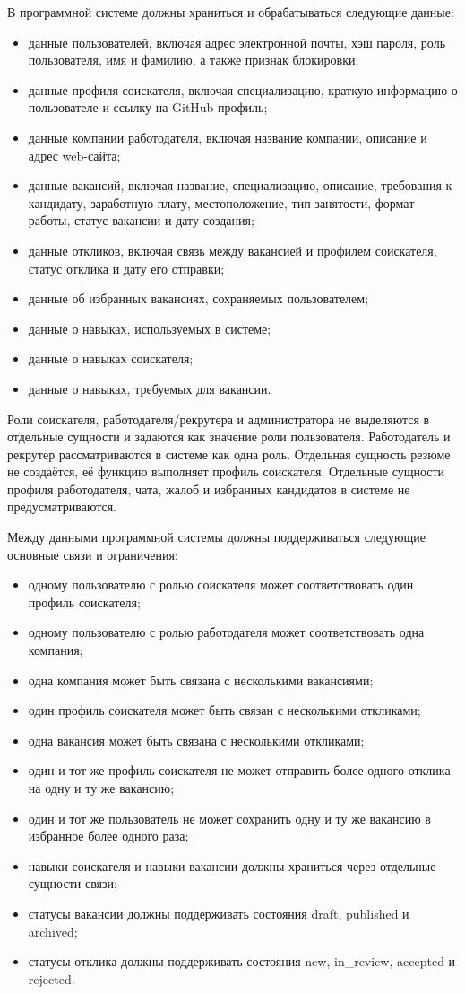 В программной системе должны храниться и обрабатываться следующие данные:
\begin{itemize}
	\item данные пользователей, включая адрес электронной почты, хэш пароля, роль пользователя, имя и фамилию, а также признак блокировки;
	\item данные профиля соискателя, включая специализацию, краткую информацию о пользователе и ссылку на GitHub-профиль;
	\item данные компании работодателя, включая название компании, описание и адрес web-сайта;
	\item данные вакансий, включая название, специализацию, описание, требования к кандидату, заработную плату, местоположение, тип занятости, формат работы, статус вакансии и дату создания;
	\item данные откликов, включая связь между вакансией и профилем соискателя, статус отклика и дату его отправки;
	\item данные об избранных вакансиях, сохраняемых пользователем;
	\item данные о навыках, используемых в системе;
	\item данные о навыках соискателя;
	\item данные о навыках, требуемых для вакансии.
\end{itemize}

Роли соискателя, работодателя/рекрутера и администратора не выделяются в отдельные сущности и задаются как значение роли пользователя. Работодатель и рекрутер рассматриваются в системе как одна роль. Отдельная сущность резюме не создаётся, её функцию выполняет профиль соискателя. Отдельные сущности профиля работодателя, чата, жалоб и избранных кандидатов в системе не предусматриваются.

Между данными программной системы должны поддерживаться следующие основные связи и ограничения:
\begin{itemize}
	\item одному пользователю с ролью соискателя может соответствовать один профиль соискателя;
	\item одному пользователю с ролью работодателя может соответствовать одна компания;
	\item одна компания может быть связана с несколькими вакансиями;
	\item один профиль соискателя может быть связан с несколькими откликами;
	\item одна вакансия может быть связана с несколькими откликами;
	\item один и тот же профиль соискателя не может отправить более одного отклика на одну и ту же вакансию;
	\item один и тот же пользователь не может сохранить одну и ту же вакансию в избранное более одного раза;
	\item навыки соискателя и навыки вакансии должны храниться через отдельные сущности связи;
	\item статусы вакансии должны поддерживать состояния draft, published и archived;
	\item статусы отклика должны поддерживать состояния new, in\_review, accepted и rejected.
\end{itemize}

